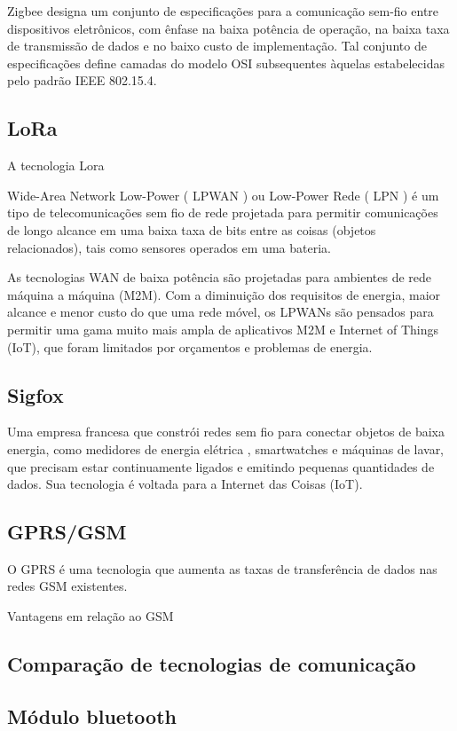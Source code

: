 Zigbee designa um conjunto de especificações para a comunicação sem-fio entre dispositivos eletrônicos, com ênfase na baixa potência de operação, na baixa taxa de transmissão de dados e no baixo custo de implementação. Tal conjunto de especificações define camadas do modelo OSI subsequentes àquelas estabelecidas pelo padrão IEEE 802.15.4.


\subsection{LoRa}

A tecnologia Lora

Wide-Area Network Low-Power ( LPWAN ) ou Low-Power Rede ( LPN ) é um tipo de telecomunicações sem fio de rede projetada para permitir comunicações de longo alcance em uma baixa taxa de bits entre as coisas (objetos relacionados), tais como sensores operados em uma bateria.

As tecnologias WAN de baixa potência são projetadas para ambientes de rede máquina a máquina (M2M). Com a diminuição dos requisitos de energia, maior alcance e menor custo do que uma rede móvel, os LPWANs são pensados para permitir uma gama muito mais ampla de aplicativos M2M e Internet of Things (IoT), que foram limitados por orçamentos e problemas de energia.



\subsection{Sigfox}

Uma empresa francesa que constrói redes sem fio para conectar objetos de baixa energia, como medidores de energia elétrica , smartwatches e máquinas de lavar, que precisam estar continuamente ligados e emitindo pequenas quantidades de dados. Sua tecnologia é voltada para a Internet das Coisas (IoT).



\subsection{GPRS/GSM}


O \ac{GPRS} é uma tecnologia que aumenta as taxas de transferência de dados nas redes \ac{GSM} existentes. 


Vantagens em relação ao GSM


\subsection{Comparação de tecnologias de comunicação}





\subsection{Módulo bluetooth}










